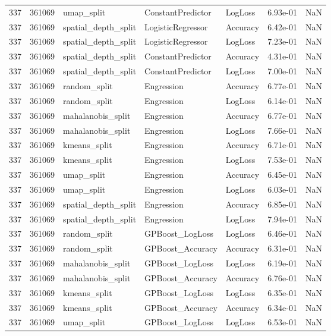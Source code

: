 \begin{tabular}{rrlllrr}
337 & 361069 & umap\_split & ConstantPredictor & LogLoss & 6.93e-01 & NaN \\
337 & 361069 & spatial\_depth\_split & LogisticRegressor & Accuracy & 6.42e-01 & NaN \\
337 & 361069 & spatial\_depth\_split & LogisticRegressor & LogLoss & 7.23e-01 & NaN \\
337 & 361069 & spatial\_depth\_split & ConstantPredictor & Accuracy & 4.31e-01 & NaN \\
337 & 361069 & spatial\_depth\_split & ConstantPredictor & LogLoss & 7.00e-01 & NaN \\
337 & 361069 & random\_split & Engression & Accuracy & 6.77e-01 & NaN \\
337 & 361069 & random\_split & Engression & LogLoss & 6.14e-01 & NaN \\
337 & 361069 & mahalanobis\_split & Engression & Accuracy & 6.77e-01 & NaN \\
337 & 361069 & mahalanobis\_split & Engression & LogLoss & 7.66e-01 & NaN \\
337 & 361069 & kmeans\_split & Engression & Accuracy & 6.71e-01 & NaN \\
337 & 361069 & kmeans\_split & Engression & LogLoss & 7.53e-01 & NaN \\
337 & 361069 & umap\_split & Engression & Accuracy & 6.45e-01 & NaN \\
337 & 361069 & umap\_split & Engression & LogLoss & 6.03e-01 & NaN \\
337 & 361069 & spatial\_depth\_split & Engression & Accuracy & 6.85e-01 & NaN \\
337 & 361069 & spatial\_depth\_split & Engression & LogLoss & 7.94e-01 & NaN \\
337 & 361069 & random\_split & GPBoost\_LogLoss & LogLoss & 6.46e-01 & NaN \\
337 & 361069 & random\_split & GPBoost\_Accuracy & Accuracy & 6.31e-01 & NaN \\
337 & 361069 & mahalanobis\_split & GPBoost\_LogLoss & LogLoss & 6.19e-01 & NaN \\
337 & 361069 & mahalanobis\_split & GPBoost\_Accuracy & Accuracy & 6.76e-01 & NaN \\
337 & 361069 & kmeans\_split & GPBoost\_LogLoss & LogLoss & 6.35e-01 & NaN \\
337 & 361069 & kmeans\_split & GPBoost\_Accuracy & Accuracy & 6.34e-01 & NaN \\
337 & 361069 & umap\_split & GPBoost\_LogLoss & LogLoss & 6.53e-01 & NaN \\

\end{tabular}
